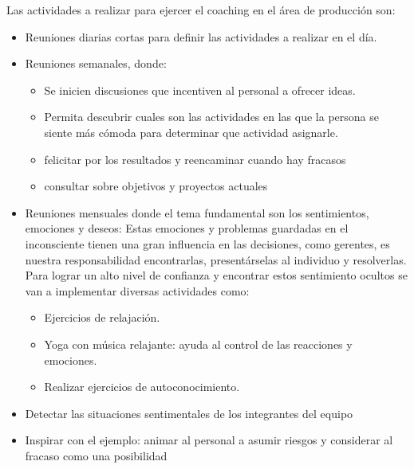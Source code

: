 Las actividades a realizar para ejercer el coaching en el área de producción son:
\begin{itemize}
\item Reuniones diarias cortas para definir las actividades a realizar en el día.
\item Reuniones semanales, donde:
    \begin{itemize}
    \item Se inicien discusiones que incentiven al personal a ofrecer ideas.
    \item Permita descubrir cuales son las actividades en las que la persona se siente más cómoda para determinar que actividad asignarle.
    \item felicitar por los resultados y reencaminar cuando hay fracasos
	\item consultar sobre objetivos y proyectos actuales
    \end{itemize}

\item Reuniones mensuales donde el tema fundamental son los sentimientos, emociones y deseos: Estas emociones y problemas guardadas en el inconsciente tienen una gran influencia en las decisiones, como gerentes, es nuestra responsabilidad encontrarlas, presentárselas al individuo y resolverlas. Para lograr un alto nivel de confianza y encontrar estos sentimiento ocultos se van a implementar diversas actividades como:
    \begin{itemize}
    \item Ejercicios de relajación.
    \item Yoga con música relajante: ayuda al control de las reacciones y emociones.
	\item Realizar ejercicios de autoconocimiento.
    \end{itemize}

\item Detectar las situaciones sentimentales de los integrantes del equipo

\item Inspirar con el ejemplo: animar al personal a asumir riesgos y considerar al fracaso como una posibilidad


\end{itemize}

